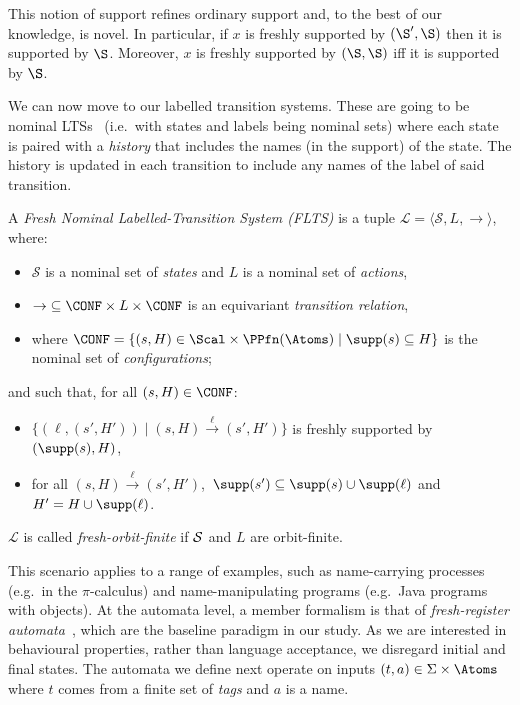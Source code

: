 This notion of support refines ordinary support and, to the best of our knowledge, is novel. In particular, if $x$ is freshly supported by $(\S',\S)$ then it is supported by $\S$. Moreover, $x$ is freshly supported by $(\S,\S)$ iff it is supported by $\S$.



We can now move to our labelled transition systems. These are going to be nominal LTSs~\cite{automatanominalsets} (i.e.\ with states and labels being nominal sets) where each state is paired with a \emph{history} that includes the names (in the support) of the state. The history is updated in each transition to include any names of the label of said transition. 

\begin{definition}
A \emph{Fresh Nominal Labelled-Transition System (FLTS)}
is a tuple $\mathcal{L}=\langle \mathcal{S},L,\rightarrow\rangle$, where:
\begin{itemize}
\item $\mathcal{S}$ is a nominal set of \emph{states}
and $L$ is a nominal set of \emph{actions},
\item    ${\rightarrow}\subseteq \CONF\times L\times\CONF$ is an equivariant \emph{transition relation},
  \item 
  where
 $\CONF=\{(s,H)\in\Scal\times\PPfn(\Atoms)\mid \supp(s)\subseteq H\}$ is the nominal set of \emph{configurations};
\end{itemize}
and such that, for all $(s,H) \in \CONF$:
 \begin{itemize}
     \item 
 $\{(\ell, (s', H'))\mid (s, H) \xrightarrow{\ell} (s', H')\}$ is freshly supported by $(\supp(s),H)$,
\item
for all $(s, H) \xrightarrow{\ell} (s', H')$,\
$\supp(s')\subseteq \supp(s)\cup \supp(\ell)$ and 
$H'=H\cup \supp(\ell)$.
 \end{itemize}
 $\mathcal{L}$ is called \emph{fresh-orbit-finite} if $\cal S$ and $L$ are orbit-finite.
\end{definition}

This scenario applies to a range of examples, such as name-carrying processes (e.g.\ in the $\pi$-calculus) and name-manipulating programs (e.g.\ Java programs with objects). At the automata level, a member formalism is that of \emph{fresh-register automata}~\cite{fra}, which are the baseline paradigm in our study. As we are interested in behavioural properties, rather than language acceptance, we disregard initial and final states. The automata we define next operate on inputs $(t,a)\in\Sigma\times\Atoms$ where $t$ comes from a finite set of \emph{tags} and $a$ is a name.  

